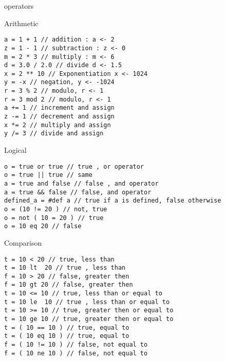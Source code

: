 \begin{section}{operators}


\begin{subsection}{Arithmetic}

\begin{center}\begin{minipage}{\linewidth}
\begin{lstlisting}[style=JexlStyle]
a = 1 + 1 // addition : a <- 2
z = 1 - 1 // subtraction : z <- 0
m = 2 * 3 // multiply : m <- 6
d = 3.0 / 2.0 // divide d <- 1.5   
x = 2 ** 10 // Exponentiation x <- 1024
y = -x // negation, y <- -1024 
r = 3 % 2 // modulo, r <- 1 
r = 3 mod 2 // modulo, r <- 1    
a += 1 // increment and assign 
z -= 1 // decrement and assign 
x *= 2 // multiply and assign 
y /= 3 // divide and assign 
\end{lstlisting}
\end{minipage}\end{center}

\end{subsection}

\begin{subsection}{Logical}
\begin{lstlisting}[style=JexlStyle]
o = true or true // true , or operator 
o = true || true // same 
a = true and false // false , and operator 
a = true && false // false, and operator  
defined_a = #def a // true if a is defined, false otherwise
o = (10 != 20 ) // not, true 
o = not ( 10 = 20 ) // true 
o = 10 eq 20 // false
\end{lstlisting}

\end{subsection}


\begin{subsection}{Comparison}
\begin{lstlisting}[style=JexlStyle]
t = 10 < 20 // true, less than
t = 10 lt  20 // true , less than 
f = 10 > 20 // false, greater then 
f = 10 gt 20 // false, greater then 
t = 10 <= 10 // true, less than or equal to 
t = 10 le  10 // true , less than or equal to 
t = 10 >= 10 // true, greater then or equal to 
t = 10 ge 10 // true, greater then or equal to 
t = ( 10 == 10 ) // true, equal to 
t = ( 10 eq 10 ) // true, equal to 
f = ( 10 != 10 ) // false, not equal to 
f = ( 10 ne 10 ) // false, not equal to 
\end{lstlisting}
\end{subsection}


\end{section}
